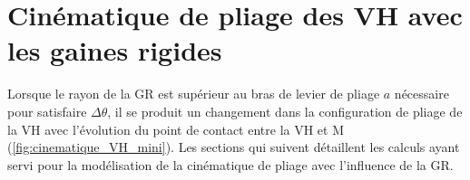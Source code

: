 

\lhead[\fancyplain{}{\leftmark}]%
      {\fancyplain{}{}} %
\chead[\fancyplain{}{}]%
      {\fancyplain{}{}}
\rhead[\fancyplain{}{}]%
      {\fancyplain{}{\rightmark}}%
\lfoot[\fancyplain{}{}]%
      {\fancyplain{}{}}
\cfoot[\fancyplain{}{\thepage}]%
      {\fancyplain{}{\thepage}} %
\rfoot[\fancyplain{}{}]%
     {\fancyplain{}{\scriptsize}}



\chapter{Cinématique de pliage des VH avec les gaines rigides}
\label{Ann:Annexe7_cinematique_M-VH}

\minitoc
\newpage

Lorsque le rayon de la GR est supérieur au bras de levier de pliage $a$ nécessaire pour satisfaire $\Delta\theta$, il se produit un changement dans la configuration de pliage de la VH avec l'évolution du point de contact entre la VH et M (\ref{fig:cinematique_VH_mini}). Les sections qui suivent détaillent les calculs ayant servi pour la modélisation de la cinématique de pliage avec l'influence de la GR.
